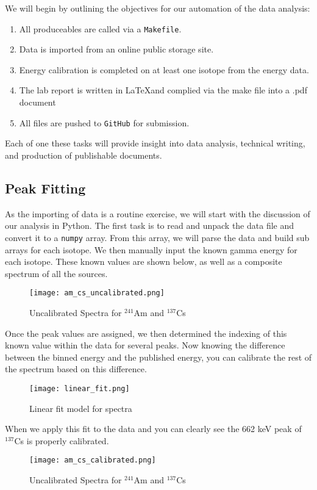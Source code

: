 We will begin by outlining the objectives for our automation of the data analysis:

\begin{enumerate}
  \item All produceables are called via a {\tt Makefile}.
  \item Data is imported from an online public storage site.
  \item Energy calibration is completed on at least one isotope from the energy data.
  \item The lab report is written in \LaTeX and complied via the make file into a .pdf document
  \item All files are pushed to {\tt GitHub} for submission.
\end{enumerate}

Each of one these tasks will provide insight into data analysis, technical writing, and
production of publishable documents.

\subsection{Peak Fitting}

As the importing of data is a routine exercise, we will start with the discussion of our analysis in Python.
The first task is to read and unpack the data file and convert it to a {\tt numpy} array. From this array, we will parse the data and
build sub arrays for each isotope. We then manually input the known gamma energy for each isotope. These known values are shown below, as well
as a composite spectrum of all the sources.

\begin{figure}[h]
  \begin{center}
      \texttt{[image: am\_cs\_uncalibrated.png]}
      \caption{\label{fig:uncal_spec}Uncalibrated Spectra for $^{241}$Am and $^{137}$Cs }
  \end{center}
\end{figure}

Once the peak values are assigned, we then determined the indexing of this known value within the data for several peaks.
Now knowing the difference between the binned energy and the published energy, you can calibrate the rest of the spectrum based
on this difference.

\begin{figure}[h]
  \begin{center}
      \texttt{[image: linear\_fit.png]}
      \caption{\label{fig:linear_fit}Linear fit model for spectra}
  \end{center}
\end{figure}


When we apply this fit to the data and you can clearly see the 662 keV peak of $^{137}$Cs is properly calibrated.

\begin{figure}
  \begin{center}
    \texttt{[image: am\_cs\_calibrated.png]}
    \caption{\label{fig:uncal_spec2}Uncalibrated Spectra for $^{241}$Am and $^{137}$Cs }
  \end{center}
\end{figure}

